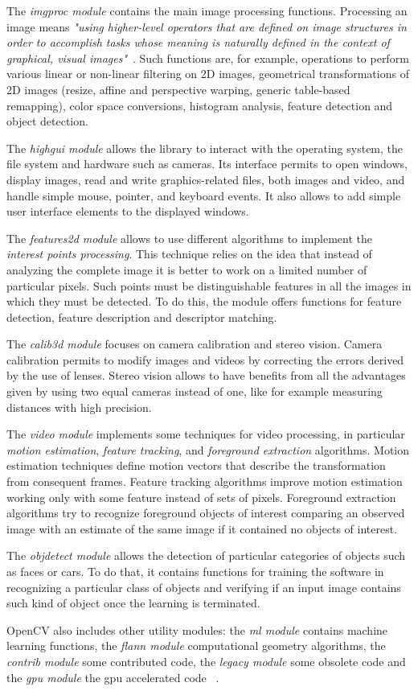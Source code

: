 	The \emph{imgproc module} contains the main image processing functions. Processing an image means \emph{"using higher-level operators that are defined on image structures in order to accomplish tasks whose meaning is naturally defined in the context of graphical, visual images"}~\cite[128]{bradski2008learning}.
	Such functions are, for example, operations to perform various linear or non-linear filtering on 2D images, geometrical transformations of 2D images (resize, affine and perspective warping, generic table-based remapping), color space conversions, histogram analysis, feature detection and object detection.
	
	The \emph{highgui module} allows the library to interact with the operating system, the file system and hardware such as cameras. Its interface permits to open windows, display images, read and write graphics-related files, both images and video, and handle simple mouse, pointer, and keyboard events. It also allows to add simple user interface elements to the displayed windows.   

	The \emph{features2d module} allows to use different algorithms to implement the \emph{interest points processing}. This technique relies on the idea that instead of analyzing the complete image it is better to work on a limited number of particular pixels. Such points must be distinguishable features in all the images in which they must be detected. 
	To do this, the module offers functions for feature detection, feature description and descriptor matching.

	The \emph{calib3d module} focuses on camera calibration and stereo vision. Camera calibration permits to modify images and videos by correcting the errors derived by the use of lenses. Stereo vision allows to have benefits from all the advantages given by using two equal cameras instead of one, like for example measuring distances with high precision.

	The \emph{video module} implements some techniques for video processing, in particular \emph{motion estimation}, \emph{feature tracking}, and \emph{foreground extraction} algorithms. Motion estimation techniques define motion vectors that describe the transformation from consequent frames. Feature tracking algorithms improve motion estimation working only with some feature instead of sets of pixels. Foreground extraction algorithms try to recognize foreground objects of interest comparing an observed image with an estimate of the same image if it contained no objects of interest. 

	 The \emph{objdetect module} allows the detection of particular categories of objects such as faces or cars. To do that, it contains functions for training the software in recognizing a particular class of objects and verifying if an input image contains such kind of object once the learning is terminated. 

	\mbox{OpenCV} also includes other utility modules: the \emph{ml module} contains machine learning functions, the \emph{flann module} computational geometry algorithms, the \emph{contrib module} some contributed code, the \emph{legacy module} some obsolete code and the \emph{gpu module} the gpu accelerated code ~\cite{laganiere2011opencv,OpenCVDoc,bradski2008learning}.


